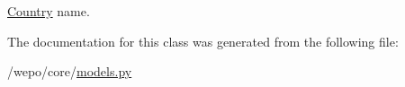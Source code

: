 \hyperlink{classcore_1_1models_1_1Country}{Country} name. 



The documentation for this class was generated from the following file\-:\begin{DoxyCompactItemize}
\item 
/wepo/core/\hyperlink{models_8py}{models.\-py}\end{DoxyCompactItemize}
